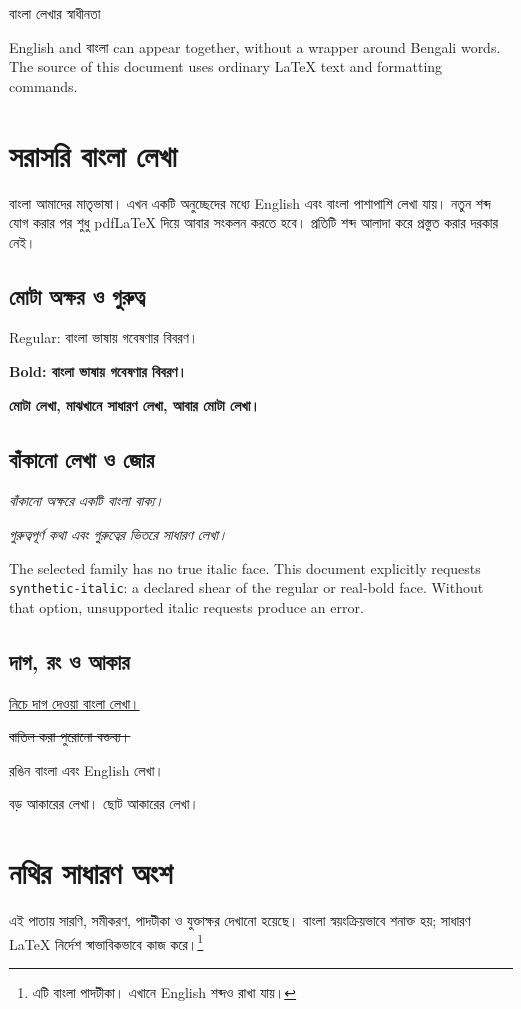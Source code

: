 \documentclass[12pt]{article}
\begin{document}
\ifnum{}\else{}\fi
{\Huge\color{accent} বাংলা লেখার স্বাধীনতা}\par
English and বাংলা can appear together, without a wrapper around Bengali words.
The source of this document uses ordinary LaTeX text and formatting commands.

\section{সরাসরি বাংলা লেখা}
বাংলা আমাদের মাতৃভাষা। এখন একটি অনুচ্ছেদের মধ্যে English এবং বাংলা পাশাপাশি লেখা যায়। নতুন শব্দ যোগ করার পর শুধু pdfLaTeX দিয়ে আবার সংকলন করতে হবে। প্রতিটি শব্দ আলাদা করে প্রস্তুত করার দরকার নেই।

\subsection{মোটা অক্ষর ও গুরুত্ব}
Regular: বাংলা ভাষায় গবেষণার বিবরণ।\par
\textbf{Bold: বাংলা ভাষায় গবেষণার বিবরণ।}\par
\textbf{মোটা লেখা, \textmd{মাঝখানে সাধারণ লেখা,} আবার মোটা লেখা।}

\subsection{বাঁকানো লেখা ও জোর}
\textit{বাঁকানো অক্ষরে একটি বাংলা বাক্য।}\par
\emph{গুরুত্বপূর্ণ কথা এবং \emph{গুরুত্বের ভিতরে সাধারণ লেখা।}}

\smallskip
{\small The selected family has no true italic face. This document explicitly
requests \texttt{synthetic-italic}: a declared shear of the regular or real-bold
face. Without that option, unsupported italic requests produce an error.}

\subsection{দাগ, রং ও আকার}
\underline{নিচে দাগ দেওয়া বাংলা লেখা।}\par
\sout{বাতিল করা পুরোনো বক্তব্য।}\par
\textcolor{accent}{রঙিন বাংলা এবং English লেখা।}\par
{\Large বড় আকারের লেখা।} {\small ছোট আকারের লেখা।}

\newpage
\section{নথির সাধারণ অংশ}
এই পাতায় সারণি, সমীকরণ, পাদটীকা ও যুক্তাক্ষর দেখানো হয়েছে।
বাংলা স্বয়ংক্রিয়ভাবে শনাক্ত হয়; সাধারণ LaTeX নির্দেশ স্বাভাবিকভাবে কাজ করে।\footnote{এটি বাংলা পাদটীকা। এখানে English শব্দও রাখা যায়।}
\end{document}
